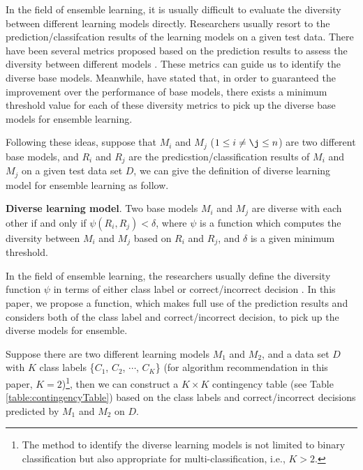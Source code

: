 \documentclass[prodmode,acmtkdd]{acmsmall}
\begin{document}
In the field of ensemble learning, it is usually difficult to
evaluate the diversity between different learning models directly.
Researchers usually resort to the prediction/classifcation results
of the learning models on a given test data. There have been several
metrics proposed based on the prediction results to assess the
diversity between different models
\cite{kuncheva2003measures,lee2013automatic,cunningham2000diversity,dietterich2000experimental}.
These metrics can guide us to identify the diverse base models.
Meanwhile, \cite{kuncheva2003measures} have stated that, in order to
guaranteed the improvement over the performance of base models,
there exists a minimum threshold value for each of these diversity
metrics to pick up the diverse base models for ensemble learning.

Following these ideas, suppose that $M_i$ and $M_j$ ($1\leq i\neq\j
\leq n$) are two different base models, and $R_i$ and $R_j$ are the
predicstion/classification results of $M_i$ and $M_j$ on a given
test data set $D$, we can give the definition of diverse learning
model for ensemble learning as follow.

\begin{definition}\textbf{Diverse learning model}\label{def:diverseModel}.
Two base models $M_i$ and $M_j$ are diverse with each other if and
only if $\psi(R_i, R_j) < \delta$, where $\psi$ is a function which
computes the diversity between $M_i$ and $M_j$ based on $R_i$ and
$R_j$, and $\delta$ is a given minimum threshold.
\end{definition}

In the field of ensemble learning, the
researchers usually define the diversity function $\psi$ in terms of
either class label or correct/incorrect decision
\cite{kohavi1996bias,dietterich2000experimental,Ho1998Random,Giacinto2000design,kuncheva2003measures}.
In this paper, we propose a function, which makes full use of the
prediction results and considers both of the class label and
correct/incorrect decision, to pick up the diverse models for
ensemble.

Suppose there are two different learning models $M_1$ and $M_2$, and
a data set $D$ with $K$ class labels \{$C_1$, $C_2$, $\cdots$,
$C_K$\} (for algorithm recommendation in this paper, $K =
2$)\footnote{The method to identify the diverse learning models is
not limited to binary classification but also appropriate for
multi-classification, i.e., $K > 2$.}, then we can construct a $K\times K$ contingency table (see
Table \ref{table:contingencyTable}) based on the class labels and
correct/incorrect decisions predicted by $M_1$ and $M_2$ on $D$.
\end{document}
